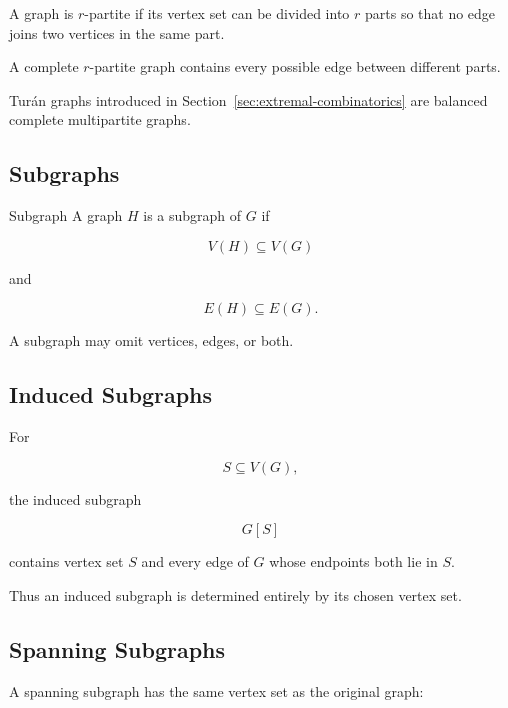 A graph is \(r\)-partite if its vertex set can be divided into \(r\)
parts so that no edge joins two vertices in the same part.

A complete \(r\)-partite graph contains every possible edge between
different parts.

Tur\'an graphs introduced in
Section~\ref{sec:extremal-combinatorics}
are balanced complete multipartite graphs.

\subsection{Subgraphs}
\label{subsec:subgraphs}

\begin{definitionbox}{Subgraph}
A graph \(H\) is a subgraph of \(G\) if

\[
V(H)\subseteq V(G)
\]

and

\[
E(H)\subseteq E(G).
\]
\end{definitionbox}

A subgraph may omit vertices, edges, or both.

\subsection{Induced Subgraphs}
\label{subsec:induced-subgraphs}

For

\[
S\subseteq V(G),
\]

the induced subgraph

\[
\boxed{
G[S]
}
\]

contains vertex set \(S\) and every edge of \(G\) whose endpoints both
lie in \(S\).

Thus an induced subgraph is determined entirely by its chosen vertex
set.

\subsection{Spanning Subgraphs}
\label{subsec:spanning-subgraphs}

A spanning subgraph has the same vertex set as the original graph:

